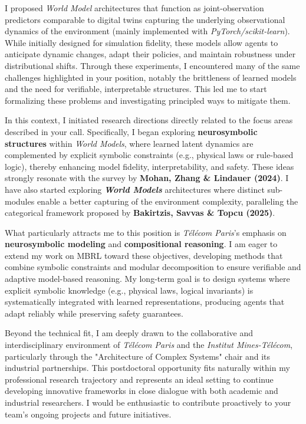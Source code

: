 \documentclass[11pt,a4paper,sans]{moderncv}
\begin{document}
I proposed \textit{World Model} architectures that function as joint-observation predictors comparable to digital twins capturing the underlying observational dynamics of the environment (mainly implemented with \textit{PyTorch/scikit-learn}). While initially designed for simulation fidelity, these models allow agents to anticipate dynamic changes, adapt their policies, and maintain robustness under distributional shifts. Through these experiments, I encountered many of the same challenges highlighted in your position, notably the brittleness of learned models and the need for verifiable, interpretable structures. This led me to start formalizing these problems and investigating principled ways to mitigate them.

In this context, I initiated research directions directly related to the focus areas described in your call. Specifically, I began exploring \textbf{neurosymbolic structures} within \textit{World Models}, where learned latent dynamics are complemented by explicit symbolic constraints (e.g., physical laws or rule-based logic), thereby enhancing model fidelity, interpretability, and safety. These ideas strongly resonate with the survey by \textbf{Mohan, Zhang \& Lindauer (2024)}. I have also started exploring \textbf{\textit{World Models}} architectures where distinct sub-modules enable a better capturing of the environment complexity, paralleling the categorical framework proposed by \textbf{Bakirtzis, Savvas \& Topcu (2025)}.

What particularly attracts me to this position is \textit{Télécom Paris}’s emphasis on \textbf{neurosymbolic modeling} and \textbf{compositional reasoning}. I am eager to extend my work on MBRL toward these objectives, developing methods that combine symbolic constraints and modular decomposition to ensure verifiable and adaptive model-based reasoning. My long-term goal is to design systems where explicit symbolic knowledge (e.g., physical laws, logical invariants) is systematically integrated with learned representations, producing agents that adapt reliably while preserving safety guarantees.

Beyond the technical fit, I am deeply drawn to the collaborative and interdisciplinary environment of \textit{\textit{Télécom Paris}} and the \textit{Institut Mines-Télécom}, particularly through the "Architecture of Complex Systems" chair and its industrial partnerships. This postdoctoral opportunity fits naturally within my professional research trajectory and represents an ideal setting to continue developing innovative frameworks in close dialogue with both academic and industrial researchers. I would be enthusiastic to contribute proactively to your team’s ongoing projects and future initiatives.


\makeletterclosing
\end{document}
